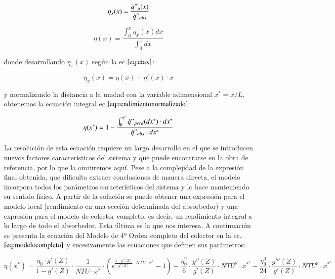 \begin{equation}
    \eta_{x}(x) = \frac{\dot{q}"_{u}(x)}{\dot{q}"_{abs}} \label{eq:rendimientolocal}
\end{equation}

\begin{equation}
    \eta(x) = \frac{\int_{0}^{x}\eta_{x}(x)dx}{\int_{0}^{x}dx} \label{eq:rendimientointegral}
\end{equation}

donde desarrollando \(\eta_{x}(x)\) según la ec.\(\eqref{eq:etax}\):

\begin{equation}
    \eta_{x}(x) = \eta(x) + \eta'(x)\cdot x  \label{eq:etax}
\end{equation}

y normalizando la distancia a la unidad con la variable adimensional \(x^{*}=x/L\), obtenemos la ecuación integral ec.\(\eqref{eq:rendimientonormalizado}\):

\begin{equation}
    \eta(x^{*}) = 1 - \frac{\int_{0}^{x^{*}} \dot{q}"_{perd}(dx^{*})\cdot dx^{*}}{\dot{q}"_{abs}\cdot dx^{*}} \label{eq:rendimientonormalizado}
\end{equation}

La resolución de esta ecuación requiere un largo desarrollo en el que se introducen nuevos factores característicos del sistema y que puede encontrarse en la obra de referencia, por lo que la omitiremos aquí. Pese a la complejidad de la expresión final obtenida, que dificulta extraer conclusiones de manera directa, el modelo incorpora todos los parámetros característicos del sistema y lo hace manteniendo su sentido físico. A partir de la solución se puede obtener una expresión para el modelo local (rendimiento en una sección determinada del absorbedor) y una expresión para el modelo de colector completo, es decir, un rendimiento integral a lo largo de todo el absorbedor. Esta última es la que nos interesa. A continuación se presenta la ecuación del Modelo de 4º Orden completo del colector en la ec.\(\eqref{eq:modelocompleto}\) y sucesivamente las ecuaciones que definen sus parámetros:

\begin{equation}
    \eta(x^{*}) = \frac{\eta_{0} \cdot g'(Z)}{1-g'(Z)} \cdot \frac{1}{NTU \cdot x^{*}} \cdot \left(e^{\frac{1-g'(Z)}{g'(Z)}\cdot NTU \cdot x^{*}} - 1\right) - \frac{\eta_{0}^2}{6} \cdot \frac{g''(Z)}{g'(Z)} \cdot NTU^{2} \cdot x^{*^{2}} - \frac{\eta_{0}^{3}}{24} \cdot \frac{g'''(Z)}{g'(Z)} \cdot NTU^{3} \cdot x^{*^{3}}
    \label{eq:modelocompleto}
\end{equation}

